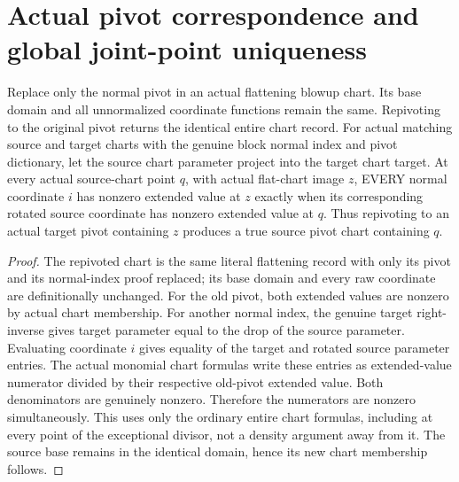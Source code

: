\section{Actual pivot correspondence and global joint-point uniqueness}

\begin{lemma}
\label{hir:submersion-blowup-pivot-same-coordinate-support}
\leanok
{}
Replace only the normal pivot in an actual flattening blowup chart. Its
base domain and all unnormalized coordinate functions remain the same. Repivoting to the original pivot returns the identical entire chart record.
For actual matching source and target charts with the genuine block normal
index and pivot dictionary, let the source chart parameter project into
the target chart target. At every actual source-chart point $q$, with actual
flat-chart image $z$, EVERY normal coordinate $i$ has nonzero extended value
at $z$ exactly when its corresponding rotated source coordinate has nonzero
extended value at $q$. Thus repivoting to an actual target pivot containing
$z$ produces a true source pivot chart containing $q$.
\end{lemma}
\begin{proof}
The repivoted chart is the same literal flattening record with only its
pivot and its normal-index proof replaced; its base domain and every raw
coordinate are definitionally unchanged. For the old pivot, both extended
values are nonzero by actual chart membership. For another normal index,
the genuine target right-inverse gives target parameter equal to the drop
of the source parameter. Evaluating coordinate $i$ gives equality of the
target and rotated source parameter entries. The actual monomial chart
formulas write these entries as extended-value numerator divided by their
respective old-pivot extended value. Both denominators are genuinely
nonzero. Therefore the numerators are nonzero simultaneously. This uses
only the ordinary entire chart formulas, including at every point of the
exceptional divisor, not a density argument away from it. The source base
remains in the identical domain, hence its new chart membership follows.
\end{proof}

